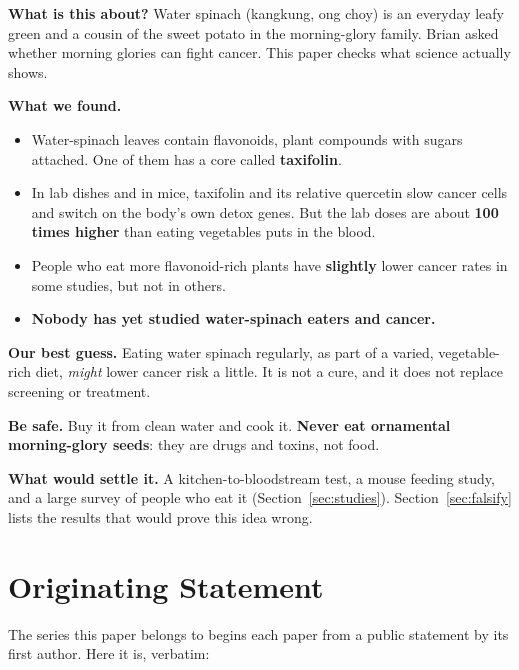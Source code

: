 \documentclass[11pt,a4paper]{article}
\begin{document}
\begin{plainbox}
\sffamily
\textbf{What is this about?} Water spinach (kangkung, ong choy) is an everyday leafy green and a cousin of the sweet potato in the morning-glory family. Brian asked whether morning glories can fight cancer. This paper checks what science actually shows.

\smallskip\textbf{What we found.}
\begin{itemize}[leftmargin=1.2em,itemsep=1pt,topsep=2pt]
\item Water-spinach leaves contain flavonoids, plant compounds with sugars attached. One of them has a core called \textbf{taxifolin}.
\item In lab dishes and in mice, taxifolin and its relative quercetin slow cancer cells and switch on the body's own detox genes. But the lab doses are about \textbf{100 times higher} than eating vegetables puts in the blood.
\item People who eat more flavonoid-rich plants have \textbf{slightly} lower cancer rates in some studies, but not in others.
\item \textbf{Nobody has yet studied water-spinach eaters and cancer.}
\end{itemize}

\smallskip\textbf{Our best guess.} Eating water spinach regularly, as part of a varied, vegetable-rich diet, \emph{might} lower cancer risk a little. It is not a cure, and it does not replace screening or treatment.

\smallskip\textbf{Be safe.} Buy it from clean water and cook it. \textbf{Never eat ornamental morning-glory seeds}: they are drugs and toxins, not food.

\smallskip\textbf{What would settle it.} A kitchen-to-bloodstream test, a mouse feeding study, and a large survey of people who eat it (Section~\ref{sec:studies}). Section~\ref{sec:falsify} lists the results that would prove this idea wrong.
\end{plainbox}

\tableofcontents

\section{Originating Statement}
\label{sec:origin}

The series this paper belongs to begins each paper from a public statement by its first author. Here it is, verbatim:
\end{document}
